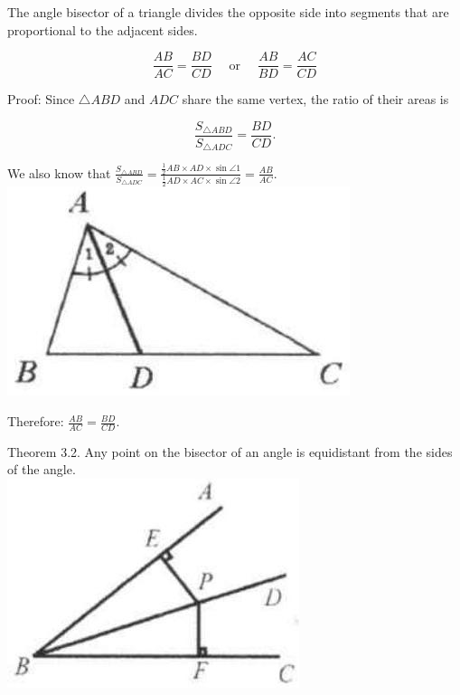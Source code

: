 \documentclass{article}
\begin{document}
The angle bisector of a triangle divides the opposite side into segments that are proportional to the adjacent sides.

\[
\frac{A B}{A C}=\frac{B D}{C D} \quad \text { or } \quad \frac{A B}{B D}=\frac{A C}{C D}
\]

Proof:
Since \(\triangle A B D\) and \(A D C\) share the same vertex, the ratio of their areas is

\[
\frac{S_{\triangle A B D}}{S_{\triangle A D C}}=\frac{B D}{C D} .
\]

We also know that \(\frac{S_{\triangle A B D}}{S_{\triangle A D C}}=\frac{\frac{1}{2} A B \times A D \times \sin \angle 1}{\frac{1}{2} A D \times A C \times \sin \angle 2}=\frac{A B}{A C}\).\\
\centering
\includegraphics[width=\textwidth]{images/053(1).jpg}

Therefore: \(\frac{A B}{A C}=\frac{B D}{C D}\).

Theorem 3.2. Any point on the bisector of an angle is equidistant from the sides of the angle.\\
\centering
\includegraphics[width=\textwidth]{images/053(2).jpg}
\end{document}
